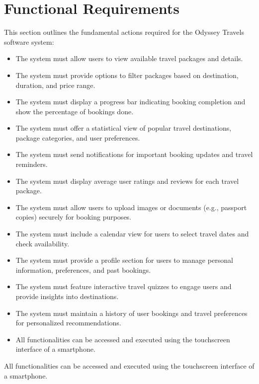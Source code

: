 \documentclass{scrreprt}
\begin{document}
\section{Functional Requirements}
This section outlines the fundamental actions required for the Odyssey Travels software system:
\begin{itemize}
    \item The system must allow users to view available travel packages and details.
    \item The system must provide options to filter packages based on destination, duration, and price range.
    \item The system must display a progress bar indicating booking completion and show the percentage of bookings done.
    \item The system must offer a statistical view of popular travel destinations, package categories, and user preferences.
    \item The system must send notifications for important booking updates and travel reminders.
    \item The system must display average user ratings and reviews for each travel package.
    \item The system must allow users to upload images or documents (e.g., passport copies) securely for booking purposes.
    \item The system must include a calendar view for users to select travel dates and check availability.
    \item The system must provide a profile section for users to manage personal information, preferences, and past bookings.
    \item The system must feature interactive travel quizzes to engage users and provide insights into destinations.
    \item The system must maintain a history of user bookings and travel preferences for personalized recommendations.
    \item All functionalities can be accessed and executed using the touchscreen interface of a smartphone.
\end{itemize}
All functionalities can be accessed and executed using the touchscreen interface of a smartphone.
\end{document}
